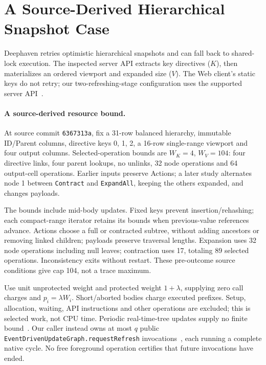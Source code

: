\section{A Source-Derived Hierarchical Snapshot Case}
\label{sec:deephaven}

Deephaven retries optimistic hierarchical snapshots and can fall back to shared-lock execution. The inspected server API extracts key directives ($K$), then materializes an ordered viewport and expanded size ($V$). The Web client's static keys do not retry; our two-refreshing-stage configuration uses the supported server API~\cite{deephavenSource}.

\paragraph{A source-derived resource bound.}
At source commit \texttt{6367313a}, fix a 31-row balanced hierarchy, immutable ID/Parent columns, directive keys 0, 1, 2, a 16-row single-range viewport and four output columns. Selected-operation bounds are $W_K=4$, $W_V=104$: four directive links, four parent lookups, no unlinks, 32 node operations and 64 output-cell operations. Earlier inputs preserve Actions; a later study alternates node 1 between \texttt{Contract} and \texttt{ExpandAll}, keeping the others expanded, and changes payloads.

The bounds include mid-body updates. Fixed keys prevent insertion/rehashing; each compact-range iterator retains its bounds when previous-value references advance. Actions choose a full or contracted subtree, without adding ancestors or removing linked children; payloads preserve traversal lengths. Expansion uses 32 node operations including null leaves; contraction uses 17, totaling 89 selected operations. Inconsistency exits without restart. These pre-outcome source conditions give cap 104, not a trace maximum.

Use unit unprotected weight and protected weight $1+\lambda$, supplying zero call charges and $p_i=\lambda W_i$. Short/aborted bodies charge executed prefixes. Setup, allocation, waiting, API instructions and other operations are excluded; this is selected work, not CPU time. Periodic real-time-tree updates supply no finite bound~\cite{deephavenTree}. Our caller instead owns at most $q$ public \texttt{EventDrivenUpdateGraph.requestRefresh} invocations~\cite{deephavenContext,deephavenSource}, each running a complete native cycle. No free foreground operation certifies that future invocations have ended.

